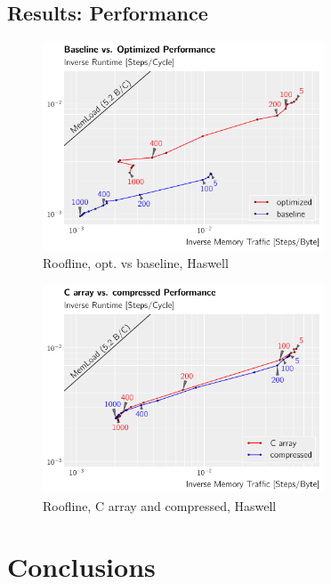 \documentclass[letterpaper]{article}
\begin{document}
\subsection{Results: Performance}
	\begin{figure}[h]\centering
		  \includegraphics[width = 8.36cm]{plots/roofline_0.pdf}
		  \caption{Roofline, opt. vs baseline, Haswell}
	\end{figure}
	\begin{figure}[h]\centering
		  \includegraphics[width = 8.36cm]{plots/roofline_1.pdf}
		  \caption{Roofline, C array and compressed, Haswell}
	\end{figure}

\section{Conclusions}



\end{document}
